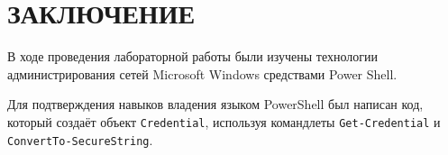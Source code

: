 \section*{ЗАКЛЮЧЕНИЕ}

В ходе проведения лабораторной работы были изучены технологии
администрирования сетей Microsoft Windows средствами Power Shell.

Для подтверждения навыков владения языком PowerShell был написан код,
который создаёт объект \texttt{Credential}, используя командлеты
\texttt{Get-Credential} и \texttt{ConvertTo-SecureString}.

\newpage